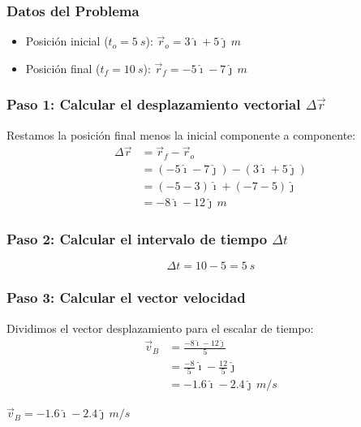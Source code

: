 \documentclass[12pt, a4paper]{article}
\begin{document}
\subsubsection*{Datos del Problema}
\begin{itemize}
    \item Posición inicial ($t_o = \SI{5}{s}$): $\vec{r}_o = 3\hat{\imath} + 5\hat{\jmath} \, \si{m}$
    \item Posición final ($t_f = \SI{10}{s}$): $\vec{r}_f = -5\hat{\imath} - 7\hat{\jmath} \, \si{m}$
\end{itemize}

\subsubsection*{Paso 1: Calcular el desplazamiento vectorial $\Delta \vec{r}$}
Restamos la posición final menos la inicial componente a componente:
\begin{align*}
    \Delta \vec{r} &= \vec{r}_f - \vec{r}_o \\
    &= (-5\hat{\imath} - 7\hat{\jmath}) - (3\hat{\imath} + 5\hat{\jmath}) \\
    &= (-5 - 3)\hat{\imath} + (-7 - 5)\hat{\jmath} \\
    &= -8\hat{\imath} - 12\hat{\jmath} \, \si{m}
\end{align*}

\subsubsection*{Paso 2: Calcular el intervalo de tiempo $\Delta t$}
\begin{equation*}
    \Delta t = 10 - 5 = \SI{5}{s}
\end{equation*}

\subsubsection*{Paso 3: Calcular el vector velocidad}
Dividimos el vector desplazamiento para el escalar de tiempo:
\begin{align*}
    \vec{v}_B &= \frac{-8\hat{\imath} - 12\hat{\jmath}}{5} \\
    &= \frac{-8}{5}\hat{\imath} - \frac{12}{5}\hat{\jmath} \\
    &= -1.6\hat{\imath} - 2.4\hat{\jmath} \, \si{m/s}
\end{align*}

\begin{tcolorbox}[colback=blue!5!white, colframe=blue!75!black, title=Respuesta Final]
    \centering
    \Large $\vec{v}_B = -1.6\hat{\imath} - 2.4\hat{\jmath} \, \si{m/s}$
\end{tcolorbox}
\end{document}
